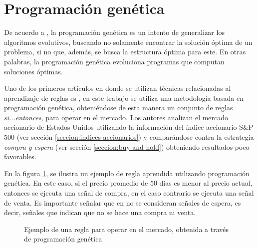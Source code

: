 \documentclass[12pt]{report}
\theoremstyle{break}
\theoremstyle{break}
\begin{document}
\section{Programación genética}
De acuerdo a \cite{simon2013evolutionary}, la programación genética es un intento de generalizar los algoritmos evolutivos, buscando no solamente encontrar la solución óptima de un problema, si no que, además, se busca la estructura óptima para este. En otras palabras, la programación genética evoluciona programas que computan soluciones óptimas.

Uno de los primeros artículos en donde se utilizan técnicas relacionadas al aprendizaje de reglas es \cite{Allen1999}, en este trabajo se utiliza una metodología basada en programación genética, obteniéndose de esta manera un conjunto de reglas \textit{si...entonces}, para operar en el mercado. Los autores analizan el mercado accionario de Estados Unidos utilizando la información del índice accionario S\&P 500 (ver sección \ref{seccion:indices accionarios}) y comparándose contra la estrategia \textit{compra y espera} (ver sección \ref{seccion:buy and hold}) obteniendo resultados poco favorables. 

En la figura \ref{imagen:progracion genetica}, se ilustra un ejemplo de regla aprendida utilizando programación genética. En este caso, si el precio promedio de $50$ días es menor al precio actual, entonces se ejecuta una señal de compra, en el caso contrario se ejecuta una señal de venta. Es importante señalar que en \cite{Allen1999} no se consideran señales de espera, es decir, señales que indican que no se hace una compra ni venta.

\begin{figure}[ht]
\centering
{}
\caption{\label{imagen:progracion genetica} Ejemplo de una regla para operar en el mercado, obtenida a través de programación genética}
\end{figure}
\end{document}
